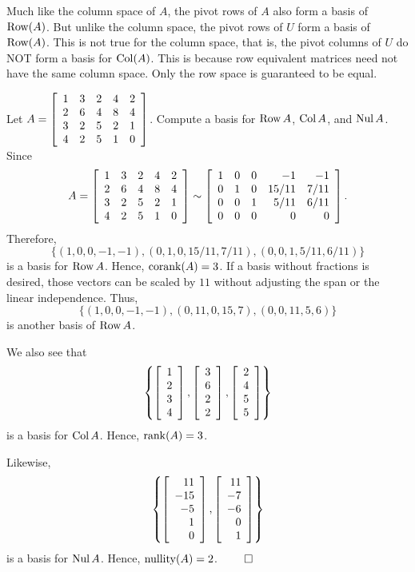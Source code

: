 Much like the column space of $A$, the pivot rows of $A$ also form a basis of $\row(A)$. But unlike the column space, the pivot rows of $U$ form a basis of $\row(A)$. This is not true for the column space, that is, the pivot columns of $U$ do NOT form a basis for $\col(A)$. This is because row equivalent matrices need not have the same column space. Only the row space is guaranteed to be equal.\\

\begin{Exam} Let $A = \mtx{rrrrr}{1 & 3 & 2 & 4 & 2 \\
 2 & 6 & 4 & 8 & 4 \\
 3 & 2 & 5 & 2 & 1 \\
 4 & 2 & 5 & 1 & 0 \\}$. Compute a basis for $\row A$, $\col A$, and $\nul A$.\\

Since \[A = \mtx{rrrrr}{1 & 3 & 2 & 4 & 2 \\
 2 & 6 & 4 & 8 & 4 \\
 3 & 2 & 5 & 2 & 1 \\
 4 & 2 & 5 & 1 & 0 \\} \sim \mtx{rrrrr}{ 1 & 0 & 0 & -1 & -1 \\
 0 & 1 & 0 & 15/11 & 7/11 \\
 0 & 0 & 1 & 5/11 & 6/11 \\ 
 0 & 0 & 0 & 0 & 0 \\}.\] Therefore, \[\{(1,0,0,-1,-1), (0,1,0,15/11,7/11), (0,0,1,5/11,6/11)\}\] is a basis for $\row A$. Hence, $\corank(A)=3$. If a basis without fractions is desired, those vectors can be scaled by $11$ without adjusting the span or the linear independence. Thus,  \[\{(1,0,0,-1,-1), (0,11,0,15,7), (0,0,11,5,6)\}\] is another basis of $\row A$.
 \begin{multicols}{2}
 We also see that \[\left\{\vr{1\\2\\3\\4}, \vr{3\\6\\2\\2}, \vr{2\\4\\5\\5}\right\}\] is a basis for $\col A$. Hence, $\rank(A)=3$. \columnbreak
 
 Likewise, \[\left\{\vr{11\\-15\\-5\\1\\0}, \vr{11\\-7\\-6\\0\\1}\right\}\]  is a basis for $\nul A$. Hence, $\nullity(A)=2$. \hfill$\qedhere$
 \end{multicols}
\end{Exam}\vs

